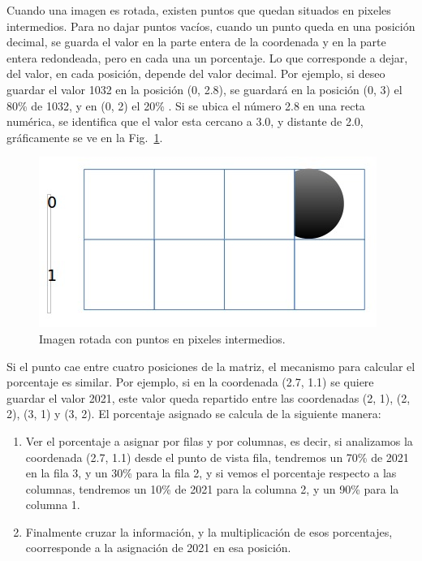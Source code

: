 Cuando una imagen es rotada, existen puntos que quedan situados en
pixeles intermedios. Para no dajar puntos vacíos, cuando un punto
queda en una posición decimal, se guarda el valor en la parte entera
de la coordenada y en la parte entera redondeada, pero en cada una un
porcentaje. Lo que corresponde a dejar, del valor, en cada posición,
depende del valor decimal. Por ejemplo, si deseo guardar el valor 1032
en la posición (0, 2.8),  se guardará en la posición (0, 3) el 80\%
de 1032, y en (0, 2) el 20\% . Si se ubica el número 2.8 en una
recta numérica, se identifica que el valor esta cercano a 3.0, y
distante de 2.0, gráficamente se ve en la Fig.~\ref{img:ppi}.

\begin{figure}[hb!]
  \begin{center}
    \includegraphics[scale=.5]{image/ppi}
  \end{center}
  \caption{Imagen rotada con puntos en pixeles
  intermedios.}\label{img:ppi}
\end{figure}

Si el punto cae entre cuatro posiciones de la matriz, el mecanismo
para calcular el porcentaje es similar. Por ejemplo, si en la
coordenada (2.7, 1.1) se quiere guardar el valor 2021, este valor
queda repartido entre las coordenadas (2, 1), (2, 2), (3, 1) y (3, 2).
El porcentaje asignado se calcula de la siguiente manera: 

\begin{enumerate}[a]
  \item Ver el porcentaje a asignar por filas y por columnas, es decir,
    si analizamos la coordenada (2.7, 1.1) desde el punto de vista
    fila, tendremos un 70\% de 2021 en la fila 3, y un 30\% para la fila
    2, y si vemos el porcentaje respecto a las columnas, tendremos un
    10\% de 2021 para la columna 2, y un 90\% para la columna 1.
  \item Finalmente cruzar la información, y la multiplicación de esos
    porcentajes, coorresponde a la asignación de 2021 en esa posición.
\end{enumerate}

